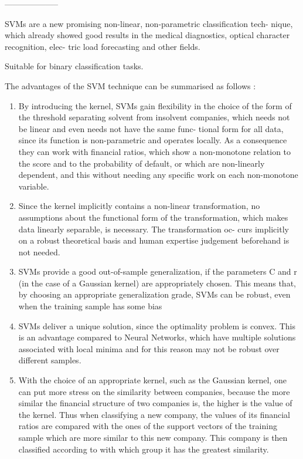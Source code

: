 --------------------

SVMs are a new promising non-linear, non-parametric classification tech- nique, which already showed good results in the medical diagnostics, optical character recognition, elec- tric load forecasting and other fields.

Suitable for binary classification tasks.

The advantages of the SVM technique can be summarised as follows \cite{auria2008support}:

\begin{enumerate}
\item By introducing the kernel, SVMs gain flexibility in the choice of the form of the threshold separating solvent from insolvent companies, which needs not be linear and even needs not have the same func- tional form for all data, since its function is non-parametric and operates locally. As a consequence they can work with financial ratios, which show a non-monotone relation to the score and to the probability of default, or which are non-linearly dependent, and this without needing any specific work on each non-monotone variable.
\item Since the kernel implicitly contains a non-linear transformation, no assumptions about the functional form of the transformation, which makes data linearly separable, is necessary. The transformation oc- curs implicitly on a robust theoretical basis and human expertise judgement beforehand is not needed.
\item SVMs provide a good out-of-sample generalization, if the parameters C and r (in the case of a Gaussian kernel) are appropriately chosen. This means that, by choosing an appropriate generalization grade, SVMs can be robust, even when the training sample has some bias
\item SVMs deliver a unique solution, since the optimality problem is convex. This is an advantage compared to Neural Networks, which have multiple solutions associated with local minima and for this reason may not be robust over different samples.
\item With the choice of an appropriate kernel, such as the Gaussian kernel, one can put more stress on the similarity between companies, because the more similar the financial structure of two companies is, the higher is the value of the kernel. Thus when classifying a new company, the values of its financial ratios are compared with the ones of the support vectors of the training sample which are more similar to this new company. This company is then classified according to with which group it has the greatest similarity.
\end{enumerate}

